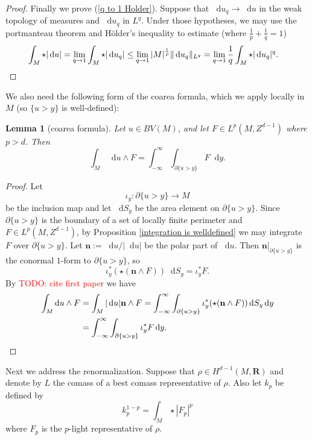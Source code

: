 \documentclass[reqno,11pt]{amsart}
\newcommand{\RR}{\mathbf{R}}
\newcommand*\dif{\mathop{}\!\mathrm{d}}
\newcommand{\normal}{\mathbf n}
\newtheorem{lemma}[theorem]{Lemma}
\theoremstyle{definition}
\numberwithin{equation}{section}
\newcommand\todo[1]{\textcolor{red}{TODO: #1}}
\begin{document}
\begin{proof}
Finally we prove (\ref{q to 1 Holder}).
Suppose that $\dif u_q \to \dif u$ in the weak topology of measures and $\dif u_q$ in $L^q$.
Under those hypotheses, we may use the portmanteau theorem and H\"older's inequality to estimate (where $\frac{1}{p} + \frac{1}{q} = 1$)
\begin{align*}
\int_M \star |\dif u| &= \lim_{q \to 1} \int_M \star |\dif u_q| \leq \lim_{q \to 1} |M|^{\frac{1}{p}} \|\dif u_q\|_{L^q} = \lim_{q \to 1} \frac{1}{q} \int_M \star |\dif u_q|^q. \qedhere
\end{align*}
\end{proof}

We also need the following form of the coarea formula, which we apply locally in $M$ (so $\{u > y\}$ is well-defined):

\begin{lemma}[coarea formula]
Let $u \in BV(M)$, and let $F \in L^p(M, Z^{d - 1})$ where $p > d$. Then 
\begin{equation}\label{coarea formula}
\int_M \dif u \wedge F = \int_{-\infty}^\infty \int_{\partial \{u > y\}} F \dif y.
\end{equation}
\end{lemma}
\begin{proof}
Let
$$\iota_y: \partial \{u > y\} \to M$$
be the inclusion map and let $\dif S_y$ be the area element on $\partial \{u > y\}$.
Since $\partial \{u > y\}$ is the boundary of a set of locally finite perimeter and $F \in L^p(M, Z^{d - 1})$, by Proposition \ref{integration is welldefined} we may integrate $F$ over $\partial \{u > y\}$.
Let $\normal := \dif u/|\dif u|$ be the polar part of $\dif u$.
Then $\normal|_{\partial \{u > y\}}$ is the conormal $1$-form to $\partial \{u > y\}$, so 
$$\iota_y^* (\star (\normal \wedge F)) \dif S_y = \iota^*_y F.$$
By \todo{cite first paper} we have 
\begin{align*}
\int_M \dif u \wedge F 
&= \int_M |\dif u| \normal \wedge F = \int_{-\infty}^\infty \int_{\partial \{u > y\}} \iota_y^* (\star (\normal \wedge F)) \dif S_y \dif y \\
&= \int_{-\infty}^\infty \int_{\partial \{u > y\}} \iota_y^* F \dif y. \qedhere
\end{align*}
\end{proof}

Next we address the renormalization.
Suppose that $\rho \in H^{d - 1}(M, \RR)$ and denote by $L$ the comass of a best comass representative of $\rho$.
Also let $k_p$ be defined by 
$$k_p^{1 - p} = \int_M \star |F_p|^p$$
where $F_p$ is the $p$-light representative of $\rho$.
\end{document}
